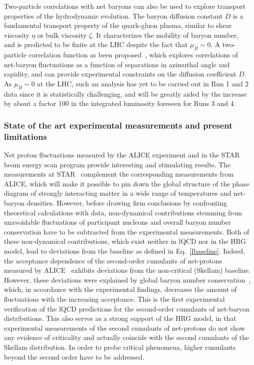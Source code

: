 Two-particle correlations with net baryons can also be used to explore transport properties of the hydrodynamic evolution. The baryon diffusion constant $D$ is a fundamental transport property of the quark-gluon plasma, similar to shear viscosity $\eta$ or bulk viscosity $\zeta$. It characterizes the mobility of baryon number, and is predicted to be finite at the LHC despite the fact that $\mu_{B}\sim0$. A two-particle correlation function as been proposed~\cite{Floerchinger:2015efa}, which explores correlations of net-baryon fluctuations as a function of separations in azimuthal angle and rapidity, and can provide experimental constraints on the diffusion coefficient $D$. As $\mu_{B}\sim0$ at the LHC, such an analysis has yet to be carried out in Run 1 and 2 data since it is statistically challenging, and will be greatly aided by the increase by about a factor 100 in the \PbPb integrated luminosity foreseen for Runs 3 and 4.

\subsubsection{State of the art experimental measurements and present limitations}

Net proton fluctuations measured by the ALICE experiment and in the STAR beam energy scan program provide interesting and stimulating results. The measurements at STAR~\cite{Adamczyk:2013dal} complement the corresponding measurements from ALICE, which will make it possible to pin down the global structure of the phase diagram of strongly interacting matter in a wide range of temperatures and net-baryon densities. However, before drawing firm conclusions by confronting theoretical calculations with  data, non-dynamical contributions stemming from unavoidable fluctuations of  participant nucleons and  overall baryon number conservation have to be subtracted from the experimental measurements. Both of these non-dynamical contributions, which exist neither in lQCD nor in the HRG model, lead to deviations from the baseline as defined in Eq.~\ref{lbaseline}. Indeed, the acceptance dependence of the second-order cumulants of net-protons measured by ALICE~\cite{Rustamov:2017lio} exhibits deviations from the non-critical (Skellam) baseline. However, these deviations were explained by global baryon number conservation~\cite{Rustamov:2017lio, Braun-Munzinger:2016yjz, Braun-Munzinger:2018yru}, which, in accordance with the experimental findings, decreases the amount of fluctuations with the increasing acceptance. This is the first experimental verification of the lQCD predictions for the second-order cumulants of net-baryon distributions. This also serves as a strong support of the HRG model, in that experimental measurements of the second cumulants of net-protons do not show any evidence of criticality and actually coincide with the second cumulants of the Skellam distribution.  In order to probe critical phenomena, higher cumulants beyond the second order have to be addressed. 


